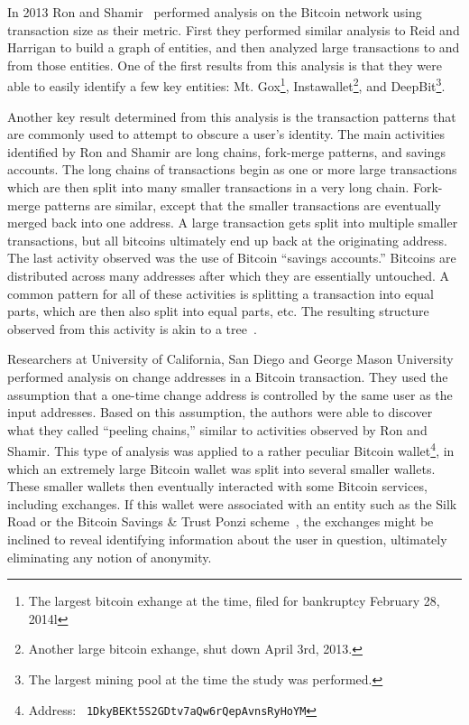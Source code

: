 \documentclass[11pt]{article}
\begin{document}
In 2013 Ron and Shamir~\cite{ron13} performed analysis on the Bitcoin network
using transaction size as their metric. First they performed similar analysis to
Reid and Harrigan to build a graph of entities, and then analyzed large
transactions to and from those entities. One of the first results from this
analysis is that they were able to easily identify a few key entities: Mt.
Gox\footnote{The largest bitcoin exhange at the time, filed for bankruptcy February 28,
2014l}, Instawallet\footnote{Another large bitcoin exhange, shut down April 3rd,
2013.}, and DeepBit\footnote{The largest mining pool at the time the study was
performed.}.

Another key result determined
from this analysis is the transaction patterns that are commonly used to attempt
to obscure a user's identity. The main activities identified by Ron and Shamir
are long chains, fork-merge patterns, and savings accounts. The long chains of
transactions begin as one or more large transactions which are then split into
many smaller transactions in a very long chain. Fork-merge patterns are similar,
except that the smaller transactions are eventually merged back into one
address. A large transaction gets split into multiple smaller transactions, but
all bitcoins ultimately end up back at the originating address. The last
activity observed was the use of Bitcoin ``savings accounts.'' Bitcoins are
distributed across many addresses after which they are essentially untouched. A
common pattern for all of these activities is splitting a transaction into equal
parts, which are then also split into equal parts, etc. The resulting structure
observed from this activity is akin to a tree~\cite{ron13}.

Researchers at University of California, San Diego and George Mason
University~\cite{meiklejohn13} performed analysis on change addresses in a
Bitcoin transaction. They used the assumption that a one-time
change address is controlled by the same user as the input addresses. Based on
this assumption, the authors were able to discover what they called ``peeling
chains,'' similar to activities observed by Ron and Shamir. This type of analysis
was applied to a rather peculiar Bitcoin wallet\footnote{Address: {\tt
1DkyBEKt5S2GDtv7aQw6rQepAvnsRyHoYM}}, in which an extremely large Bitcoin wallet
was split into several smaller wallets. These smaller wallets then eventually
interacted with some Bitcoin services, including exchanges. If this wallet were
associated with an entity such as the Silk Road or the Bitcoin Savings \& Trust
Ponzi scheme~\cite{moore13}, the exchanges might be inclined to reveal
identifying information about the user in question, ultimately eliminating any
notion of anonymity.
\end{document}
